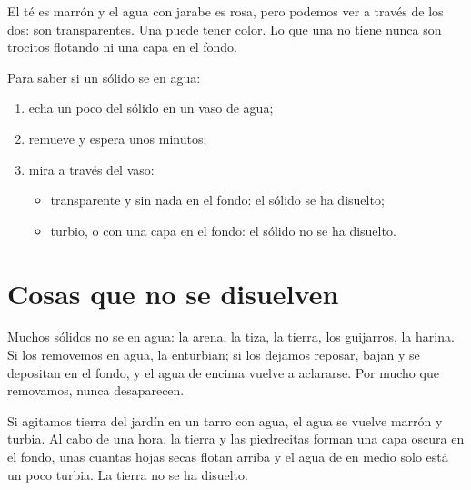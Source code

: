 \begin{remark}\label{rem:g2:mixing-and-dissolving:clear}
El té es marrón y el agua con jarabe es rosa, pero podemos ver a través
de los dos: son transparentes. Una  puede tener color. Lo que
una  no tiene nunca son trocitos flotando ni una capa en el
fondo.
\end{remark}

\begin{method}[¿Se disuelve?]\label{met:g2:mixing-and-dissolving:test}
Para saber si un sólido se  en agua:
\begin{enumerate}
  \item echa un poco del sólido en un vaso de agua;
  \item remueve y espera unos minutos;
  \item mira a través del vaso:
    \begin{itemize}
      \item transparente y sin nada en el fondo: el sólido se ha disuelto;
      \item turbio, o con una capa en el fondo: el sólido no se ha disuelto.
    \end{itemize}
\end{enumerate}
\end{method}

\section{Cosas que no se disuelven}

\begin{proposition}\label{prop:g2:mixing-and-dissolving:not}
Muchos sólidos no se  en agua: la arena, la tiza, la tierra,
los guijarros, la harina. Si los removemos en agua, la enturbian; si
los dejamos reposar, bajan y se depositan en el fondo, y el agua de
encima vuelve a aclararse. Por mucho que removamos, nunca desaparecen.
\end{proposition}

\begin{example}\label{ex:g2:mixing-and-dissolving:mud}
Si agitamos tierra del jardín en un tarro con agua, el agua se vuelve
marrón y turbia. Al cabo de una hora, la tierra y las piedrecitas forman
una capa oscura en el fondo, unas cuantas hojas secas flotan arriba y
el agua de en medio solo está un poco turbia. La tierra no se ha
disuelto.
\end{example}

